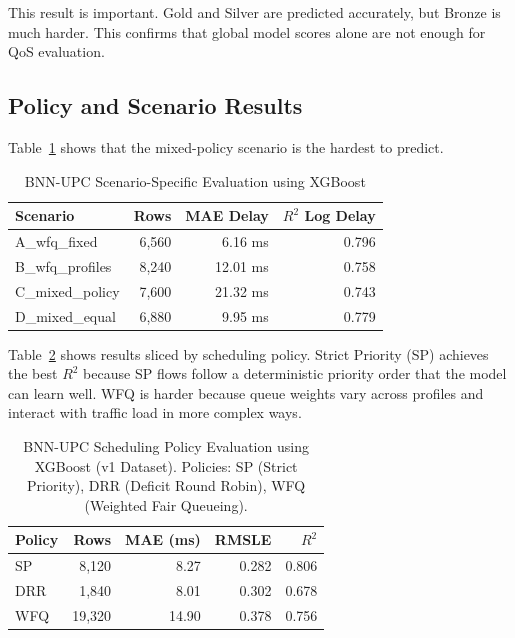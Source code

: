 \documentclass[a4paper,12pt]{Classes/RoboticsLaTeX}
\begin{document}
This result is important. Gold and Silver are predicted accurately, but Bronze is much harder. This confirms that global model scores alone are not enough for QoS evaluation.

\subsection{Policy and Scenario Results}

Table~\ref{tab:scenario_results} shows that the mixed-policy scenario is the hardest to predict.

\begin{table}[H]
\centering
\caption{BNN-UPC Scenario-Specific Evaluation using XGBoost}
\label{tab:scenario_results}
\begin{tabular}{|l|r|r|r|}
\hline
\textbf{Scenario} & \textbf{Rows} & \textbf{MAE Delay} & \textbf{$R^2$ Log Delay} \\
\hline
A\_wfq\_fixed & 6,560 & 6.16 ms & 0.796 \\
\hline
B\_wfq\_profiles & 8,240 & 12.01 ms & 0.758 \\
\hline
C\_mixed\_policy & 7,600 & 21.32 ms & 0.743 \\
\hline
D\_mixed\_equal & 6,880 & 9.95 ms & 0.779 \\
\hline
\end{tabular}
\end{table}

Table~\ref{tab:policy_results} shows results sliced by scheduling policy. Strict Priority (SP) achieves the best $R^2$ because SP flows follow a deterministic priority order that the model can learn well. WFQ is harder because queue weights vary across profiles and interact with traffic load in more complex ways.

\begin{table}[H]
\centering
\caption{BNN-UPC Scheduling Policy Evaluation using XGBoost (v1 Dataset). Policies: SP (Strict Priority), DRR (Deficit Round Robin), WFQ (Weighted Fair Queueing).}
\label{tab:policy_results}
\begin{tabular}{|l|r|r|r|r|}
\hline
\textbf{Policy} & \textbf{Rows} & \textbf{MAE (ms)} & \textbf{RMSLE} & \textbf{$R^2$} \\
\hline
SP & 8,120 & 8.27 & 0.282 & 0.806 \\
\hline
DRR & 1,840 & 8.01 & 0.302 & 0.678 \\
\hline
WFQ & 19,320 & 14.90 & 0.378 & 0.756 \\
\hline
\end{tabular}
\end{table}
\end{document}
